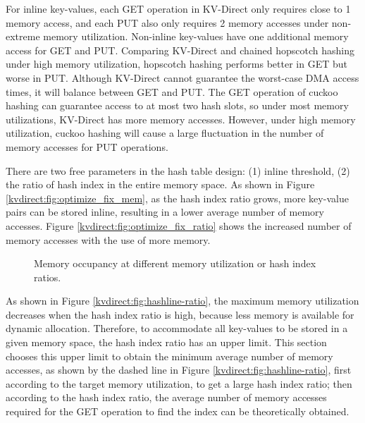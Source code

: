 For inline key-values, each GET operation in KV-Direct only requires close to 1 memory access, and each PUT also only requires 2 memory accesses under non-extreme memory utilization. Non-inline key-values have one additional memory access for GET and PUT. Comparing KV-Direct and chained hopscotch hashing under high memory utilization, hopscotch hashing performs better in GET but worse in PUT. Although KV-Direct cannot guarantee the worst-case DMA access times, it will balance between GET and PUT. The GET operation of cuckoo hashing can guarantee access to at most two hash slots, so under most memory utilizations, KV-Direct has more memory accesses. However, under high memory utilization, cuckoo hashing will cause a large fluctuation in the number of memory accesses for PUT operations.

\label{kvdirect:sec:hashtable-eval}

There are two free parameters in the hash table design: (1) inline threshold, (2) the ratio of hash index in the entire memory space. As shown in Figure \ref {kvdirect:fig:optimize_fix_mem}, as the hash index ratio grows, more key-value pairs can be stored inline, resulting in a lower average number of memory accesses. Figure \ref {kvdirect:fig:optimize_fix_ratio} shows the increased number of memory accesses with the use of more memory.

\begin{figure}[htbp]
	\caption{Memory occupancy at different memory utilization or hash index ratios.}
	\label{kvdirect:fig:memory-access-count}
\end{figure}

As shown in Figure \ref {kvdirect:fig:hashline-ratio}, the maximum memory utilization decreases when the hash index ratio is high, because less memory is available for dynamic allocation. Therefore, to accommodate all key-values to be stored in a given memory space, the hash index ratio has an upper limit. This section chooses this upper limit to obtain the minimum average number of memory accesses, as shown by the dashed line in Figure \ref {kvdirect:fig:hashline-ratio}, first according to the target memory utilization, to get a large hash index ratio; then according to the hash index ratio, the average number of memory accesses required for the GET operation to find the index can be theoretically obtained.

